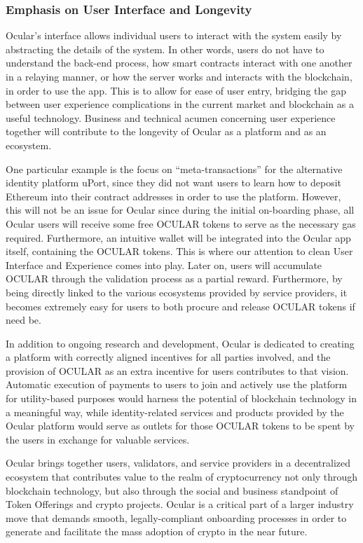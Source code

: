 \documentclass[a4paper]{article}
\begin{document}
\subsubsection*{Emphasis on User Interface and Longevity}
Ocular's interface allows individual users to interact with the system easily by abstracting the details of the system. In other words, users do not have to understand the back-end process, how smart contracts interact with one another in a relaying manner, or how the server works and interacts with the blockchain, in order to use the app. This is to allow for ease of user entry, bridging the gap between user experience complications in the current market and blockchain as a useful technology. Business and technical acumen concerning user experience together will contribute to the longevity of Ocular as a platform and as an ecosystem.

One particular example is the focus on ``meta-transactions'' for the alternative identity platform uPort, since they did not want users to learn how to deposit Ethereum into their contract addresses in order to use the platform. However, this will not be an issue for Ocular since during the initial on-boarding phase, all Ocular users will receive some free OCULAR tokens to serve as the necessary gas required. Furthermore, an intuitive wallet will be integrated into the Ocular app itself, containing the OCULAR tokens. This is where our attention to clean User Interface and Experience comes into play. Later on, users will accumulate OCULAR through the validation process as a partial reward. Furthermore, by being directly linked to the various ecosystems provided by service providers, it becomes extremely easy for users to both procure and release OCULAR tokens if need be.  

In addition to ongoing research and development, Ocular is dedicated to creating a platform with correctly aligned incentives for all parties involved, and the provision of OCULAR as an extra incentive for users contributes to that vision. Automatic execution of payments to users to join and actively use the platform for utility-based purposes would harness the potential of blockchain technology in a meaningful way, while identity-related services and products provided by the Ocular platform would serve as outlets for those OCULAR tokens to be spent by the users in exchange for valuable services. 

Ocular brings together users, validators, and service providers in a decentralized ecosystem that contributes value to the realm of cryptocurrency not only through blockchain technology, but also through the social and business standpoint of Token Offerings and crypto projects. Ocular is a critical part of a larger industry move that demands smooth, legally-compliant onboarding processes in order to generate and facilitate the mass adoption of crypto in the near future.
\end{document}
